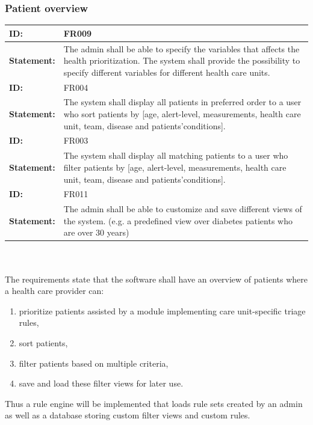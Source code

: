 \documentclass{article}
\begin{document}
\subsubsection{Patient overview}
\begin{tabularx}{\linewidth}{| l | X |}
 \hline
 \textbf{ID:} & FR009  \\ 
 \hline
 \textbf{Statement:} & The admin shall be able to specify the variables that affects the health prioritization. The system shall provide the possibility to specify different variables for different health care units. 
 \\ 
 \hline
 
 \textbf{ID:} & FR004  \\ 
 \hline
 \textbf{Statement:} & The system shall display all patients in preferred order to a user who sort patients by [age, alert-level, measurements, health care unit, team, disease and patients’conditions]. \\ 
 \hline
 
 \textbf{ID:} & FR003  \\ 
 \hline
 \textbf{Statement:} & The system shall display all matching patients to a user who filter patients by [age, alert-level, measurements, health care unit, team, disease and patients’conditions]. \\ 
 \hline

 \textbf{ID:} & FR011  \\ 
 \hline
 \textbf{Statement:} & The admin shall be able to customize and save different views of the system. (e.g. a predefined view over diabetes patients who are over 30 years)
  \\ 
 \hline
\end{tabularx}
\\ \\

The requirements state that the software shall have an overview of patients where a health care provider can:
\begin{enumerate}[label=(\roman*)]
\item prioritize patients assisted by a module implementing care unit-specific triage rules,
\item sort patients,
\item filter patients based on multiple criteria,
\item save and load these filter views for later use.
\end{enumerate}
Thus a rule engine will be implemented that loads rule sets created by an admin as well as a database storing custom filter views and custom rules.
\end{document}
